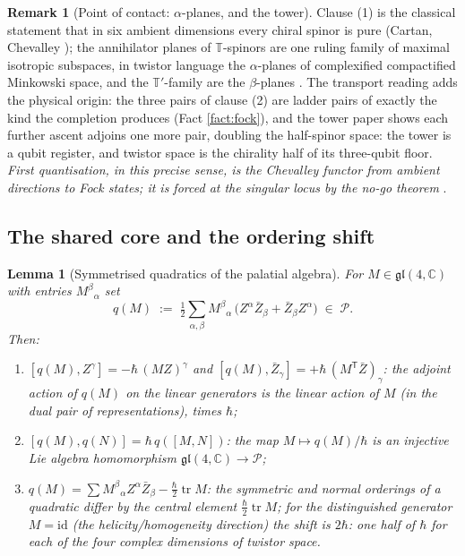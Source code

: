 \documentclass[11pt]{article}
\newtheorem{lemma}[theorem]{Lemma}
\theoremstyle{definition}
\newtheorem{remark}[theorem]{Remark}
\newcommand{\C}{\mathbb{C}}
\newcommand{\T}{\mathbb{T}}
\begin{document}
\begin{remark}[Point of contact: $\alpha$-planes, and the tower]\label{rem:alphaplanes}
Clause (1) is the classical statement that in six ambient dimensions every chiral spinor is pure (Cartan, Chevalley \cite{Chevalley54}); the annihilator planes of $\T$-spinors are one ruling family of maximal isotropic subspaces, in twistor language the $\alpha$-planes of complexified compactified Minkowski space, and the $\T'$-family are the $\beta$-planes \cite{Penrose1967, PenroseRindler86}. The transport reading adds the physical origin: the three pairs of clause (2) are ladder pairs of exactly the kind the completion produces (Fact \ref{fact:fock}), and the tower paper \cite[\S 4]{ButlerT3} shows each further ascent adjoins one more pair, doubling the half-spinor space: the tower is a qubit register, and twistor space is the chirality half of its three-qubit floor. \emph{First quantisation, in this precise sense, is the Chevalley functor from ambient directions to Fock states; it is forced at the singular locus by the no-go theorem} \cite[Thm.~4.2]{ButlerT1}.
\end{remark}

\subsection{The shared core and the ordering shift}\label{subsec:core}

\begin{lemma}[Symmetrised quadratics of the palatial algebra]\label{lem:weyl}
For $M \in \mathfrak{gl}(4,\C)$ with entries $M^\beta{}_\alpha$ set
\[
q(M) \;:=\; \tfrac12 \sum_{\alpha,\beta} M^\beta{}_\alpha\,\bigl(Z^\alpha \bar Z_\beta + \bar Z_\beta Z^\alpha\bigr) \;\in\; \mathcal{P}.
\]
Then:
\begin{enumerate}
\item $[q(M), Z^\gamma] = -\hbar\,(MZ)^\gamma$ and $[q(M), \bar Z_\gamma] = +\hbar\,(M^{\mathsf T}\bar Z)_\gamma$: the adjoint action of $q(M)$ on the linear generators is the linear action of $M$ (in the dual pair of representations), times $\hbar$;
\item $[q(M), q(N)] = \hbar\, q([M,N])$: the map $M \mapsto q(M)/\hbar$ is an injective Lie algebra homomorphism $\mathfrak{gl}(4,\C) \to \mathcal{P}$;
\item $q(M) = \sum M^\beta{}_\alpha Z^\alpha \bar Z_\beta - \tfrac{\hbar}{2}\operatorname{tr} M$: the symmetric and normal orderings of a quadratic differ by the central element $\tfrac{\hbar}{2}\operatorname{tr}M$; for the distinguished generator $M = \mathrm{id}$ (the helicity/homogeneity direction) the shift is $2\hbar$: one half of $\hbar$ for each of the four complex dimensions of twistor space.
\end{enumerate}
\end{lemma}
\end{document}
